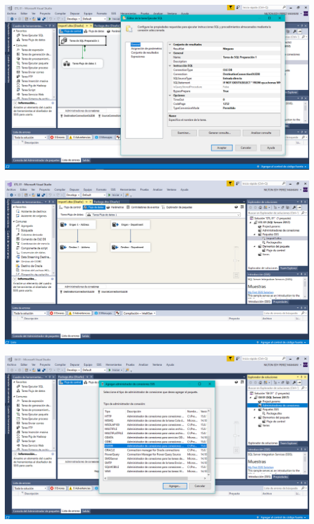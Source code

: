 {\begin{center}
\end{center}
\begin{center}
\includegraphics[width=15cm]{./Imagenes/imagen16}
\end{center}
\begin{center}
\includegraphics[width=15cm]{./Imagenes/imagen17}
\end{center}
\begin{center}
\includegraphics[width=15cm]{./Imagenes/imagen18}
\end{center}
}

